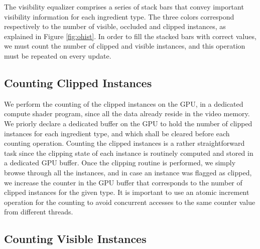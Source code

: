 
The visibility equalizer comprises a series of stack bars that convey important visibility information for each ingredient type.
The three colors correspond respectively to the number of visible, occluded and clipped instances, as explained in Figure \ref{fig:ohist}.
In order to fill the stacked bars with correct values, we must count the number of clipped and visible instances, and this operation must be repeated on every update.

\subsection{Counting Clipped Instances}

We perform the counting of the clipped instances on the GPU, in a dedicated compute shader program, since all the data already reside in the video memory.
We priorly declare a dedicated buffer on the GPU to hold the number of clipped instances for each ingredient type, and which shall be cleared before each counting operation.
Counting the clipped instances is a rather straightforward task since the clipping state of each instance is routinely computed and stored in a dedicated GPU buffer.
Once the clipping routine is performed, we simply browse through all the instances, and in case an instance was flagged as clipped, we increase the counter in the GPU buffer that corresponds to the number of clipped instances for the given type.
It is important to use an atomic increment operation for the counting to avoid concurrent accesses to the same counter value from different threads. 

\subsection{Counting Visible Instances}

